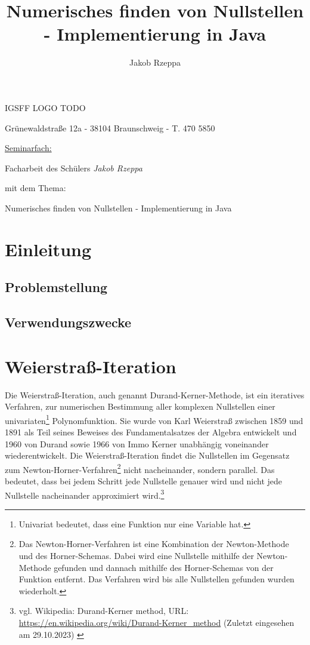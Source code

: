 \documentclass[12pt]{article}
\title{Numerisches finden von Nullstellen - Implementierung in Java}
\author{Jakob Rzeppa}
\begin{document}
\begin{titlepage}
	\centering
    {\huge IGSFF LOGO TODO\par}
	{Grünewaldstraße 12a - 38104 Braunschweig - T. 470 5850\par}
	\vspace{1cm}
	{\underline{Seminarfach:}\par}
	\vspace{1cm}
    {\large Facharbeit des Schülers \textit{Jakob Rzeppa} \par mit dem Thema: \par}
    \vspace{1.5cm}
	{\huge Numerisches finden von Nullstellen - Implementierung in Java\par}
	\vspace{2cm}
\end{titlepage}

\tableofcontents

\section{Einleitung}

\subsection{Problemstellung}

\subsection{Verwendungszwecke}

\section{Weierstraß-Iteration}
Die Weierstraß-Iteration, auch genannt Durand-Kerner-Methode, ist ein iteratives Verfahren, zur numerischen Bestimmung aller komplexen Nullstellen einer univariaten\footnote{Univariat bedeutet, dass eine Funktion nur eine Variable hat.} Polynomfunktion.
Sie wurde von Karl Weierstraß zwischen 1859 und 1891 als Teil seines Beweises des Fundamentalsatzes der Algebra entwickelt und 1960 von Durand sowie 1966 von Immo Kerner unabhängig voneinander wiederentwickelt.
Die Weierstraß-Iteration findet die Nullstellen im Gegensatz zum Newton-Horner-Verfahren\footnote{
    Das Newton-Horner-Verfahren ist eine Kombination der Newton-Methode und des Horner-Schemas. Dabei wird eine Nullstelle mithilfe der Newton-Methode gefunden und dannach mithilfe des Horner-Schemas von der Funktion entfernt. Das Verfahren wird bis alle Nullstellen gefunden wurden wiederholt.
}
nicht nacheinander, sondern parallel. Das bedeutet, dass bei jedem Schritt jede Nullstelle genauer wird und nicht jede Nullstelle nacheinander approximiert wird.\footnote{
    vgl. Wikipedia: Durand-Kerner method, URL: \url{https://en.wikipedia.org/wiki/Durand-Kerner_method} (Zuletzt eingesehen am 29.10.2023)
    \label{ftn:Wikipedia-Durand-Kerner-Method}
}
\end{document}
